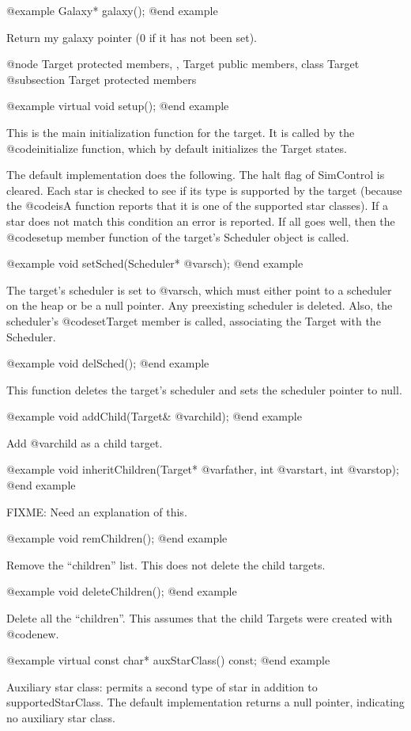 @example
Galaxy* galaxy();
@end example

Return my galaxy pointer (0 if it has not been set).

@node Target protected members,  , Target public members, class Target
@subsection Target protected members

@example
virtual void setup();
@end example

This is the main initialization function for the target.  It is called
by the @code{initialize} function, which by default initializes the
Target states.

The default implementation does the following.  The halt flag of
SimControl is cleared.  Each star is checked to see if its type is
supported by the target (because the @code{isA} function reports
that it is one of the supported star classes).  If a star does not
match this condition an error is reported.  If all goes well, then
the @code{setup} member function of the target's Scheduler object
is called.

@example
void setSched(Scheduler* @var{sch});
@end example

The target's scheduler is set to @var{sch}, which must either point to a
scheduler on the heap or be a null pointer.  Any preexisting scheduler
is deleted.  Also, the scheduler's @code{setTarget} member is called,
associating the Target with the Scheduler.

@example
void delSched();
@end example

This function deletes the target's scheduler and sets the scheduler
pointer to null.

@example
void addChild(Target& @var{child});
@end example

Add @var{child} as a child target.

@example
void inheritChildren(Target* @var{father}, int @var{start}, int @var{stop});
@end example

FIXME: Need an explanation of this.

@example
void remChildren();
@end example

Remove the ``children'' list.  This does not delete the child targets.

@example
void deleteChildren();
@end example

Delete all the ``children''.  This assumes that the child Targets
were created with @code{new}.

@example
virtual const char* auxStarClass() const;
@end example

Auxiliary star class: permits a second type of star in addition
to supportedStarClass.  The default implementation returns a
null pointer, indicating no auxiliary star class.


